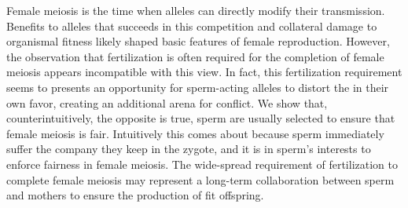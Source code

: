 \documentclass{article}
\begin{document}
Female meiosis is the time when alleles can directly modify their transmission. Benefits to alleles that succeeds in this competition and collateral damage to organismal fitness likely shaped basic features of female reproduction. However, the observation that fertilization is often required for the completion of female meiosis appears incompatible with this view. In fact, this fertilization requirement seems to presents an opportunity for sperm-acting alleles to distort the in their own favor, creating an additional arena for conflict. We show that, counterintuitively, the opposite is true, sperm are usually selected to ensure that female meiosis is fair. Intuitively this comes about because sperm immediately suffer the company they keep in the zygote, and it is in sperm's interests to enforce fairness in female meiosis. The wide-spread requirement of fertilization to complete female meiosis may represent a long-term collaboration between sperm and mothers to ensure the production of fit offspring.
\end{document}
